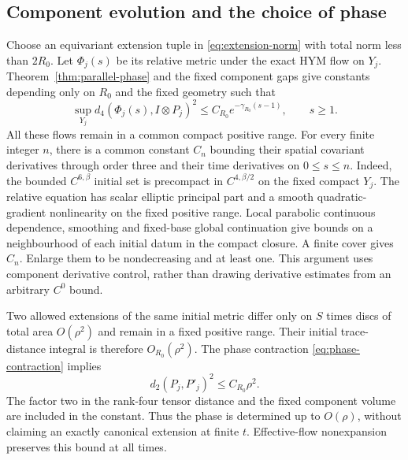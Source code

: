 \subsection{Component evolution and the choice of phase}
Choose an equivariant extension tuple in \eqref{eq:extension-norm}
with total norm less than $2R_0$. Let $\Phi_j(s)$ be its relative
metric under the exact HYM flow on $Y_j$. Theorem~\ref{thm:parallel-phase}
and the fixed component gaps give constants depending only on $R_0$
and the fixed geometry such that
\begin{equation}\label{eq:component-phase-rate}
 \sup_{Y_j}d_4(\Phi_j(s),I\otimes P_j)^2
       \le C_{R_0}e^{-\gamma_{R_0}(s-1)},\qquad s\ge1.
\end{equation}
All these flows remain in a common compact positive range.
For every finite integer $n$, there is a common constant $C_n$
bounding their spatial covariant derivatives through order three and
their time derivatives on $0\le s\le n$. Indeed, the bounded
$C^{6,\beta}$ initial set is precompact in $C^{4,\beta/2}$ on the
fixed compact $Y_j$. The relative equation has scalar elliptic
principal part and a smooth quadratic-gradient nonlinearity on the
fixed positive range. Local parabolic continuous dependence,
smoothing and fixed-base global continuation give bounds on a
neighbourhood of each initial datum in the compact closure. A finite
cover gives $C_n$. Enlarge them to be nondecreasing and at least one.
This argument uses component derivative control, rather than drawing
derivative estimates from an arbitrary $C^0$ bound.

Two allowed extensions of the same initial metric differ only on
$S$ times discs of total area $O(\rho^2)$ and remain in a fixed
positive range. Their initial trace-distance integral is therefore
$O_{R_0}(\rho^2)$. The phase contraction
\eqref{eq:phase-contraction} implies
\begin{equation}\label{eq:phase-ambiguity}
 d_2(P_j,P'_j)^2\le C_{R_0}\rho^2.
\end{equation}
The factor two in the rank-four tensor distance and the fixed component
volume are included in the constant. Thus the phase is determined up
to $O(\rho)$, without claiming an exactly canonical extension at
finite $t$. Effective-flow nonexpansion preserves this bound at all times.

